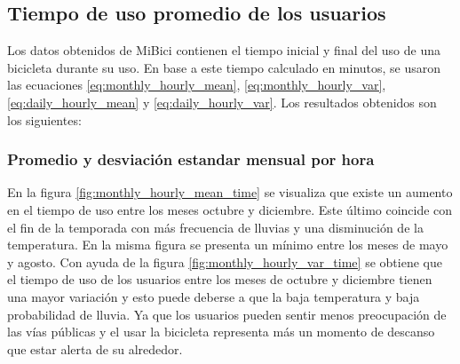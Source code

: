 \subsection{Tiempo de uso promedio de los usuarios}

Los datos obtenidos de MiBici contienen el tiempo inicial y final del uso de una bicicleta durante su uso. En base a este tiempo calculado en minutos, se usaron las ecuaciones \ref{eq:monthly_hourly_mean}, \ref{eq:monthly_hourly_var}, \ref{eq:daily_hourly_mean} y \ref{eq:daily_hourly_var}. Los resultados obtenidos son los siguientes:

\subsubsection{Promedio y desviación estandar mensual por hora}

En la figura \ref{fig:monthly_hourly_mean_time} se visualiza que existe un aumento en el tiempo de uso entre los meses octubre y diciembre. Este último coincide con el fin de la temporada con más frecuencia de lluvias y una disminución de la temperatura\cite{clima_guadalajara}. En la misma figura se presenta un mínimo entre los meses de mayo y agosto. Con ayuda de la figura \ref{fig:monthly_hourly_var_time} se obtiene que el tiempo de uso de los usuarios entre los meses de octubre y diciembre tienen una mayor variación y esto puede deberse a que la baja temperatura y baja probabilidad de lluvia\cite{clima_guadalajara}. Ya que los usuarios pueden sentir menos preocupación de las vías públicas y el usar la bicicleta representa más un momento de descanso que estar alerta de su alrededor.

